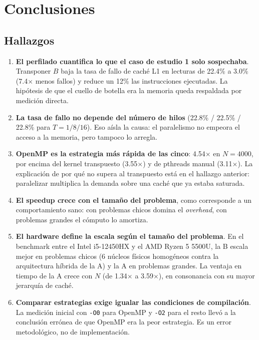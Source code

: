 \section{Conclusiones}

\subsection{Hallazgos}

\begin{enumerate}
    \item \textbf{El perfilado cuantifica lo que el caso de estudio 1 solo sospechaba}. Transponer $B$ baja la tasa de fallo de caché L1 en lecturas de 22.4\% a 3.0\% (7.4$\times$ menos fallos) y reduce un 12\% las instrucciones ejecutadas. La hipótesis de que el cuello de botella era la memoria queda respaldada por medición directa.

    \item \textbf{La tasa de fallo no depende del número de hilos} (22.8\% / 22.5\% / 22.8\% para $T=1/8/16$). Eso aísla la causa: el paralelismo no empeora el acceso a la memoria, pero tampoco lo arregla.

    \item \textbf{OpenMP es la estrategia más rápida de las cinco}: 4.54$\times$ en $N=4000$, por encima del kernel transpuesto (3.55$\times$) y de pthreads manual (3.11$\times$). La explicación de por qué no supera al transpuesto está en el hallazgo anterior: paralelizar multiplica la demanda sobre una caché que ya estaba saturada.

    \item \textbf{El speedup crece con el tamaño del problema}, como corresponde a un comportamiento sano: con problemas chicos domina el \emph{overhead}, con problemas grandes el cómputo lo amortiza.

    \item \textbf{El hardware define la escala según el tamaño del problema}. En el benchmark entre el Intel i5-12450HX y el AMD Ryzen 5 5500U, la B escala mejor en problemas chicos (6 núcleos físicos homogéneos contra la arquitectura híbrida de la A) y la A en problemas grandes. La ventaja en tiempo de la A crece con $N$ (de 1.34$\times$ a 3.59$\times$), en consonancia con su mayor jerarquía de caché.

    \item \textbf{Comparar estrategias exige igualar las condiciones de compilación}. La medición inicial con \texttt{-O0} para OpenMP y \texttt{-O2} para el resto llevó a la conclusión errónea de que OpenMP era la peor estrategia. Es un error metodológico, no de implementación.
\end{enumerate}

